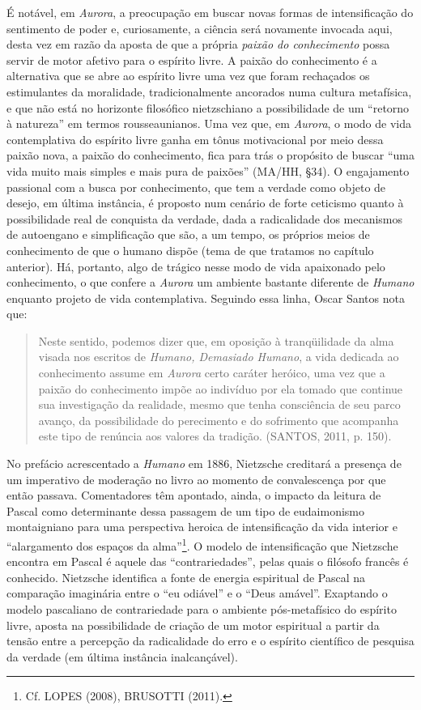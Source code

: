 \documentclass[
	12pt,				%
	openright,			%
	oneside,			%
	a4paper,			%
	english,			%
	french,				%
	spanish,			%
	brazil				%
	]{abntex2}
\begin{document}
É notável, em \textit{Aurora}, a preocupação em buscar novas formas de intensificação do sentimento de poder e, curiosamente, a ciência será novamente invocada aqui, desta vez em razão da aposta de que a própria \textit{paixão do conhecimento} possa servir de motor afetivo para o espírito livre. A paixão do conhecimento é a alternativa que se abre ao espírito livre uma vez que foram rechaçados os estimulantes da moralidade, tradicionalmente ancorados numa cultura metafísica, e que não está no horizonte filosófico nietzschiano a possibilidade de um “retorno à natureza” em termos rousseaunianos. Uma vez que, em \textit{Aurora}, o modo de vida contemplativa do espírito livre ganha em tônus motivacional por meio dessa paixão nova, a paixão do conhecimento, fica para trás o propósito de buscar “uma vida muito mais simples e mais pura de paixões” (MA/HH, §34). O engajamento passional com a busca por conhecimento, que tem a verdade como objeto de desejo, em última instância, é proposto num cenário de forte ceticismo quanto à possibilidade real de conquista da verdade, dada a radicalidade dos mecanismos de autoengano e simplificação que são, a um tempo, os próprios meios de conhecimento de que o humano dispõe (tema de que tratamos no capítulo anterior). Há, portanto, algo de trágico nesse modo de vida apaixonado pelo conhecimento,  o que confere a \textit{Aurora} um ambiente bastante diferente de \textit{Humano} enquanto projeto de vida contemplativa. Seguindo essa linha, Oscar Santos nota que:

\begin{quotation}
Neste sentido, podemos dizer que, em oposição à tranqüilidade da alma visada nos escritos de \textit{Humano, Demasiado Humano}, a vida dedicada ao conhecimento assume em \textit{Aurora} certo caráter heróico, uma vez que a paixão do conhecimento impõe ao indivíduo por ela tomado que continue sua investigação da realidade, mesmo que tenha consciência de seu parco avanço, da possibilidade do perecimento e do sofrimento que acompanha este tipo de renúncia aos valores da tradição. (SANTOS, 2011, p. 150).
\end{quotation}

No prefácio acrescentado a \textit{Humano} em 1886, Nietzsche creditará a presença de um imperativo de moderação no livro ao momento de convalescença por que então passava. Comentadores têm apontado, ainda, o impacto da leitura de Pascal como determinante dessa passagem de um tipo de eudaimonismo montaigniano para uma perspectiva heroica de intensificação da vida interior e “alargamento dos espaços da alma”\footnote{Cf. LOPES (2008), BRUSOTTI (2011).}. O modelo de intensificação que Nietzsche encontra em Pascal é aquele das “contrariedades”, pelas quais o filósofo francês é conhecido. Nietzsche identifica a fonte de energia espiritual de Pascal na comparação imaginária entre o “eu odiável” e o “Deus amável”. Exaptando o modelo pascaliano de contrariedade para o ambiente pós-metafísico do espírito livre, aposta na possibilidade de criação de um motor espiritual a partir da tensão entre a percepção da radicalidade do erro e o espírito científico de pesquisa da verdade (em última instância inalcançável).
\end{document}
